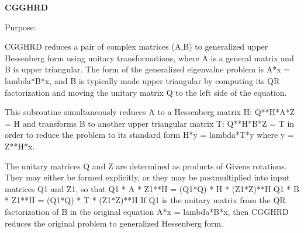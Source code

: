 {\bfseries C\+G\+G\+H\+R\+D} 

 \begin{DoxyParagraph}{Purpose\+: }
\begin{DoxyVerb} CGGHRD reduces a pair of complex matrices (A,B) to generalized upper
 Hessenberg form using unitary transformations, where A is a
 general matrix and B is upper triangular.  The form of the generalized
 eigenvalue problem is
    A*x = lambda*B*x,
 and B is typically made upper triangular by computing its QR
 factorization and moving the unitary matrix Q to the left side
 of the equation.

 This subroutine simultaneously reduces A to a Hessenberg matrix H:
    Q**H*A*Z = H
 and transforms B to another upper triangular matrix T:
    Q**H*B*Z = T
 in order to reduce the problem to its standard form
    H*y = lambda*T*y
 where y = Z**H*x.

 The unitary matrices Q and Z are determined as products of Givens
 rotations.  They may either be formed explicitly, or they may be
 postmultiplied into input matrices Q1 and Z1, so that
      Q1 * A * Z1**H = (Q1*Q) * H * (Z1*Z)**H
      Q1 * B * Z1**H = (Q1*Q) * T * (Z1*Z)**H
 If Q1 is the unitary matrix from the QR factorization of B in the
 original equation A*x = lambda*B*x, then CGGHRD reduces the original
 problem to generalized Hessenberg form.\end{DoxyVerb}
 
\end{DoxyParagraph}

